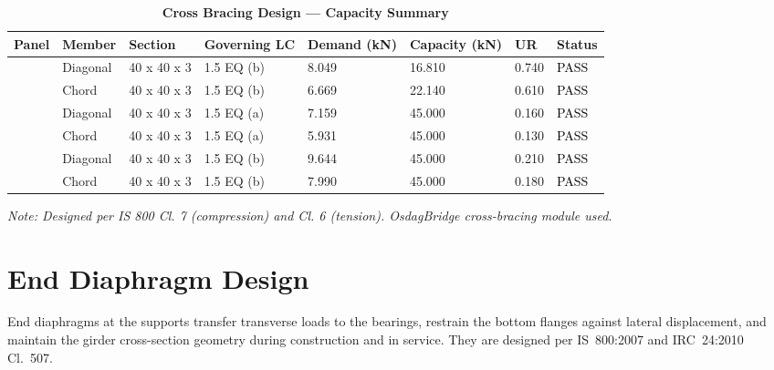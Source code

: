 \documentclass[12pt,a4paper]{report}
\numberwithin{table}{chapter}
\numberwithin{figure}{chapter}
\begin{document}
\vspace{1em}
\begin{longtable}{|C{2.0cm}|L{1.8cm}|C{2.2cm}|C{3.0cm}|C{1.8cm}|C{1.8cm}|C{1.2cm}|C{1.8cm}|}
\caption{\textbf{Cross Bracing Design --- Capacity Summary}}
\hline
\textbf{Panel} & \textbf{Member} & \textbf{Section} & \textbf{Governing LC} & \textbf{Demand (kN)} & \textbf{Capacity (kN)} & \textbf{UR} & \textbf{Status} \\[6pt]
\hline
{} & Diagonal & 40 x 40 x 3 & 1.5 EQ (b) & 8.049 & 16.810 & 0.740 & \textcolor{black}{PASS} \\[6pt]
 & Chord & 40 x 40 x 3 & 1.5 EQ (b) & 6.669 & 22.140 & 0.610 & \textcolor{black}{PASS} \\[6pt]
\hline
{} & Diagonal & 40 x 40 x 3 & 1.5 EQ (a) & 7.159 & 45.000 & 0.160 & \textcolor{black}{PASS} \\[6pt]
 & Chord & 40 x 40 x 3 & 1.5 EQ (a) & 5.931 & 45.000 & 0.130 & \textcolor{black}{PASS} \\[6pt]
\hline
{} & Diagonal & 40 x 40 x 3 & 1.5 EQ (b) & 9.644 & 45.000 & 0.210 & \textcolor{black}{PASS} \\[6pt]
 & Chord & 40 x 40 x 3 & 1.5 EQ (b) & 7.990 & 45.000 & 0.180 & \textcolor{black}{PASS} \\[6pt]
\hline
\end{longtable}
\noindent\textit{Note: Designed per IS 800 Cl. 7 (compression) and Cl. 6 (tension). OsdagBridge cross-bracing module used.}

\section{End Diaphragm Design}
\label{sec:end-diaphragm}

End diaphragms at the supports transfer transverse loads to the bearings, restrain the bottom flanges against lateral displacement, and maintain the girder cross-section geometry during construction and in service. They are designed per IS~800:2007 and IRC~24:2010 Cl.~507.

\vspace{1em}

\vspace{0.4em}
\noindent
\setlength{\tabcolsep}{4pt}
\setlength{\LTleft}{0pt}
\setlength{\LTright}{\fill}
\end{document}
